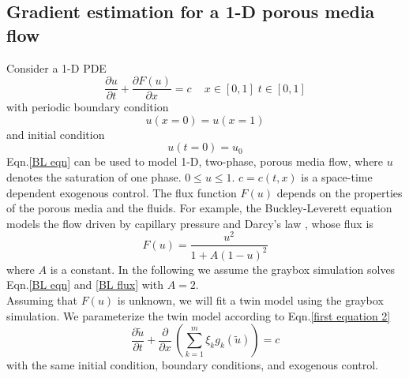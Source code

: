 \documentclass{paper1}
\begin{document}
\subsection{Gradient estimation for a 1-D porous media flow}
Consider a 1-D PDE
\begin{equation}
    \frac{\partial u}{\partial t} + \frac{\partial F(u)}{\partial x} = c\,\quad x\in[0,1]\; t\in[0,1]
    \label{BL eqn}
\end{equation}
with periodic boundary condition
\begin{equation}
    u(x=0) = u(x=1)
\end{equation}
and initial condition
\begin{equation}
    u(t=0) = u_0
\end{equation}
Eqn.\eqref{BL eqn} can be used to model 1-D, two-phase, porous media flow, where $u$
denotes the saturation of one phase. $0\le u\le 1$. $c=c(t,x)$ is a space-time dependent exogenous control.
The flux function $F(u)$ depends on the properties of the porous media and the fluids.
For example, the Buckley-Leverett equation models the flow driven by 
capillary pressure and Darcy's law \cite{Buckley Leverett}, whose flux is
\begin{equation}
    F(u) = \frac{u^2}{1+A(1-u)^2}
    \label{BL flux}
\end{equation}
where $A$ is a constant. In the following we assume the graybox simulation
solves Eqn.\eqref{BL eqn} and \eqref{BL flux} with $A=2$.
\\

Assuming that $F(u)$ is unknown, we will fit a twin model 
using the graybox simulation.
We parameterize the twin model according to Eqn.\eqref{first equation 2}
\begin{equation}
    \frac{\partial \tilde{u}}{\partial t} + \frac{\partial}{\partial x}\,
    \left(\sum_{k=1}^m \xi_k g_{k}(\tilde{u})\right) = c
    \label{twin model 3}
\end{equation}
with the same initial condition, boundary conditions, and exogenous control. 
\end{document}

